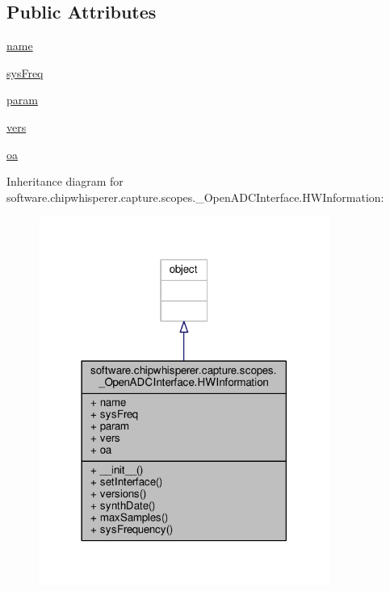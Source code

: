 \subsection*{Public Attributes}
\begin{DoxyCompactItemize}
\item 
\hyperlink{classsoftware_1_1chipwhisperer_1_1capture_1_1scopes_1_1__OpenADCInterface_1_1HWInformation_a68537335bcac877714b67e69d2fc6bc0}{name}
\item 
\hyperlink{classsoftware_1_1chipwhisperer_1_1capture_1_1scopes_1_1__OpenADCInterface_1_1HWInformation_a768e93413d8e47f83e93144ff055d30c}{sys\+Freq}
\item 
\hyperlink{classsoftware_1_1chipwhisperer_1_1capture_1_1scopes_1_1__OpenADCInterface_1_1HWInformation_adb570c40c4404dad0e814ad19dde3c9c}{param}
\item 
\hyperlink{classsoftware_1_1chipwhisperer_1_1capture_1_1scopes_1_1__OpenADCInterface_1_1HWInformation_ad302158b36d83a818672a6d53768214c}{vers}
\item 
\hyperlink{classsoftware_1_1chipwhisperer_1_1capture_1_1scopes_1_1__OpenADCInterface_1_1HWInformation_a10e3d20fa6064a5f32791c5bc518f6c5}{oa}
\end{DoxyCompactItemize}


Inheritance diagram for software.\+chipwhisperer.\+capture.\+scopes.\+\_\+\+Open\+A\+D\+C\+Interface.\+H\+W\+Information\+:\nopagebreak
\begin{figure}[H]
\begin{center}
\leavevmode
\includegraphics[width=270pt]{d9/da6/classsoftware_1_1chipwhisperer_1_1capture_1_1scopes_1_1__OpenADCInterface_1_1HWInformation__inherit__graph}
\end{center}
\end{figure}


